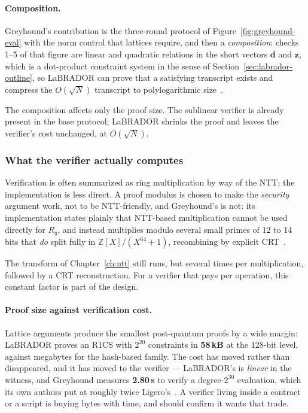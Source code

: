 \paragraph{Composition.}
Greyhound's contribution is the three-round protocol of
Figure~\ref{fig:greyhound-eval} with the norm control that lattices require,
and then a \emph{composition}: checks 1--5 of that figure are linear and
quadratic relations in the short vectors $\mathbf{d}$ and $\mathbf{z}$, which is
a dot-product constraint system in the sense of
Section~\ref{sec:labrador-outline}, so LaBRADOR can prove that a satisfying
transcript exists and compress the $O(\sqrt{N})$ transcript to
polylogarithmic size~\cite{greyhound2024}.

The composition affects only the proof size. The sublinear verifier is already
present in the base protocol; LaBRADOR shrinks the proof and leaves the
verifier's cost unchanged, at $O(\sqrt{N})$.

\subsubsection{What the verifier actually computes}
Verification is often summarized as ring multiplication by way of the NTT; the
implementation is less direct. A proof modulus is
chosen to make the \emph{security} argument work, not to be NTT-friendly, and
Greyhound's is not: its implementation states plainly that NTT-based
multiplication cannot be used directly for $R_q$, and instead multiplies modulo
several small primes of 12 to 14 bits that \emph{do} split fully in
$\mathbb{Z}[X]/(X^{64}+1)$, recombining by explicit CRT~\cite{greyhound2024}.

The transform of Chapter~\ref{ch:ntt} still runs, but several times per
multiplication, followed by a CRT reconstruction. For a verifier that pays per
operation, this constant factor is part of the design.

\paragraph{Proof size against verification cost.}
Lattice arguments produce the smallest post-quantum proofs by a wide margin: LaBRADOR proves an
R1CS with $2^{20}$ constraints in \textbf{58\,kB} at the 128-bit level, against
megabytes for the hash-based family. The cost has moved rather than disappeared,
and it has moved to the verifier --- LaBRADOR's is \emph{linear} in the witness,
and Greyhound measures \textbf{2.80\,s} to verify a degree-$2^{30}$ evaluation,
which its own authors put at roughly twice Ligero's~\cite{greyhound2024}. A
verifier living inside a contract or a script is buying bytes with time, and
should confirm it wants that trade.

